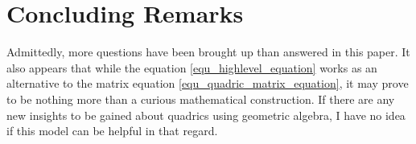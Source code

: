 \documentclass{ecgd-l}
\theoremstyle{definition}
\theoremstyle{remark}
\numberwithin{equation}{section}
\begin{document}
\section{Concluding Remarks}

Admittedly, more questions have been brought up than answered in this paper.
It also appears that while the equation \eqref{equ_highlevel_equation}
works as an alternative to the matrix equation \eqref{equ_quadric_matrix_equation},
it may prove to be nothing more than a curious mathematical construction.  If there are
any new insights to be gained about quadrics using geometric algebra, I have no idea
if this model can be helpful in that regard.




\end{document}
